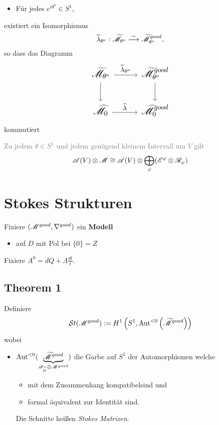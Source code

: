\begin{paracol}{2} %
  \begin{thm}
    \begin{itemize}
      \item Für jedes $e^{i\theta^o}\in S^1$,
    \end{itemize}
    existiert ein Isomorphismus
    \[
      \widetilde\lambda_{\theta^o}: \widetilde{\mathscr{M}}_{\theta^o}
      \overset{\sim}{\longrightarrow}\widetilde{\mathscr{M}}^{good}_{\theta^o},
    \]
    so dass das Diagramm
    \[\Large\begin{tikzcd}
        \tilde\sM_{\theta^o} \dar \rar{\tilde\lambda_{\theta^o}} &
        \tilde\sM^{good}_{\theta^o} \dar
      \\\hat\sM_0 \rar{\hat\lambda} &
        \hat\sM_0^{good}
      \end{tikzcd} \]
    kommutiert
  \end{thm}
\switchcolumn %
\begin{thm}
  \textcolor{gray}{%
    Zu jedem $\theta\in S^1$ und jedem genügend kleinem Intervall um $V$ gilt
    \[
      \mathscr{A}(V)\otimes\mathscr{M}\cong\mathscr{A}(V)\otimes\bigoplus_\varphi(\mathscr{E}^\varphi\otimes\mathscr{R}_\varphi)
    \]
  }
\end{thm}
\end{paracol} %
\section{Stokes Strukturen} %
\begin{paracol}{2}
  Fixiere $(\mathscr{M}^{good},\nabla^{good})$ ein \textbf{Modell}
  \begin{itemize}
    \item auf $D$ mit Pol bei $\{0\}=Z$
  \end{itemize}
\switchcolumn
  Fixiere $A^0=dQ+\Lambda\frac{dt}{t}$.
\end{paracol}
\subsection{Theorem 1} %
\begin{defn}
  Definiere
  \[
    \mathcal{S}{}t(\mathscr{M}^{good})
      :=H^1\left(S^1,\operatorname{Aut}^{<0}\left(\widetilde {\mathscr{M}}^{good}\right)\right)
  \]
  wobei
  \begin{itemize}
    \item $\operatorname{Aut}^{<0}(\underset{\mathscr{A}_{\widetilde D}\otimes\mathscr{M}^{good}}
      {\underbrace{\widetilde{\mathscr{M}}^{good}}})$
      die Garbe auf $S^1$ der Automorphismen welche
      \begin{itemize}
        \item mit dem Zusammenhang kompatibel\TODO[in Formeln] sind und
        \item formal äquivalent zur Identität sind.
      \end{itemize}
      Die Schnitte heißen \emph{Stokes Matrizen}.
  \end{itemize}
\end{defn}

